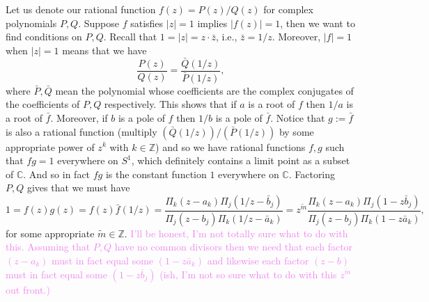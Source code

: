\documentclass[12pt,letterpaper,boxed]{hmcpset}
\newcommand{\wg}[1]{\textcolor{violet}{#1}}
\newcommand{\C}{\mathbb C}
\newcommand{\Z}{\mathbb Z}
\newcommand{\abs}[1]{\left|#1\right|}
\begin{document}
\begin{solution}

Let us denote our rational function $f(z) = P(z)/ Q(z)$ for complex
polynomials $P,Q$.
Suppose $f$ satisfies $\abs z = 1$ implies $\abs{f(z)} = 1$, then we
want to find conditions on $P,Q$.
Recall that $1 = \abs{z} = z \cdot \bar z$, i.e., $\bar z = 1/z$. Moreover,
$\abs{f} = 1$ when $\abs z = 1$ means that we have \[
	\frac{P(z)}{Q(z)} = \frac{\bar Q(1/z)}{\bar P(1/z)},
\]
where $\bar P, \bar Q$ mean the polynomial whose coefficients are the
complex conjugates of the coefficients of $P,Q$ respectively.
This shows that if $a$ is a root of $f$ then $1/a$ is a root of $\bar
f$. Moreover, if $b$ is a pole of $f$ then $1/b$ is a pole of $\bar
f$. Notice that $g:= \bar f$ is also a rational function (multiply $(\bar
Q(1/z))/(\bar P(1/z))$ by some appropriate power of $z^k$ with $k \in
\Z$) and so we have rational functions $f,g$ such that $fg = 1$
everywhere on $S^1$, which definitely contains a limit point as a
subset of $\C$. And so in fact $fg$ is the constant function $1$
everywhere on $\C$. Factoring $P,Q$ gives that we must have  \[
1 = f(z)g(z) = f(z) \bar f(1/z) = 
\frac{\Pi_k (z - a_k) \Pi_j (1/z -\bar b_j)}{ \Pi_j (z - b_j) \Pi_k(1/z - \bar a_k)}
= z^{\tilde m} \frac{\Pi_k (z - a_k) \Pi_j (1 - z\bar b_j)}{ \Pi_j (z
- b_j) \Pi_k(1 - z\bar a_k)},
\]
for some appropriate $\tilde m \in \Z$. 
\wg{I'll be honest, I'm not totally sure what to do with this.
Assuming that $P,Q$ have no common divisors then we need that each
factor $(z -a_k)$ must in fact equal some $(1 - z \bar a_k)$ and
likewise each factor $(z-b)$ must in fact equal some $(1 - z\bar b_j)$
(ish, I'm not so sure what to do with this $z^{\tilde m}$ out front.)}

\end{solution}

\newpage

\end{document}
